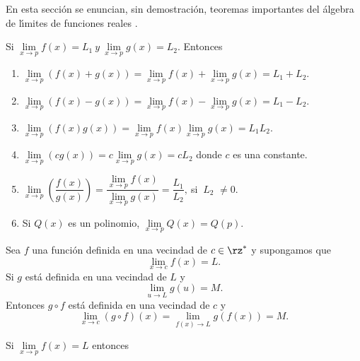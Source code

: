 En esta secci\'{o}n se enuncian, sin demostraci\'{o}n, teoremas importantes
del \'{a}lgebra de l\'{\i}mites de funciones reales .

\begin{theorem}
\label{a1}Si $\lim\limits_{x\rightarrow p}f(x)=L_{1}\ y\ \lim
\limits_{x\rightarrow p}g(x)=L_{2}$. Entonces

\begin{enumerate}
\item $\lim\limits_{x\rightarrow p}\left(  f(x)+g(x)\right)  =\lim
\limits_{x\rightarrow p}f(x)+\lim\limits_{x\rightarrow p}g(x)=L_{1}+L_{2}.$

\item $\lim\limits_{x\rightarrow p}\left(  f(x)-g(x)\right)  =\lim
\limits_{x\rightarrow p}f(x)-\lim\limits_{x\rightarrow p}g(x)=L_{1}-L_{2}.$

\item $\lim\limits_{x\rightarrow p}\left(  f(x)g(x)\right)  =\lim
\limits_{x\rightarrow p}f(x)\lim\limits_{x\rightarrow p}g(x)=L_{1}L_{2}.$

\item $\lim\limits_{x\rightarrow p}\left(  cg(x)\right)  =c\lim
\limits_{x\rightarrow p}g(x)=cL_{2}$ donde $c$ es una constante.

\item $\lim\limits_{x\rightarrow p}\left(  \dfrac{f(x)}{g(x)}\right)
=\dfrac{\lim\limits_{x\rightarrow p}f(x)}{\lim\limits_{x\rightarrow p}%
g(x)}=\dfrac{L_{1}}{L_{2}},\ $si $\ L_{2}$ $\neq0.$

\item Si $Q\left(  x\right)  $ es un polinomio, $\lim\limits_{x\rightarrow
p}Q(x)=Q(p).$
\end{enumerate}
\end{theorem}

\begin{theorem}
\label{limitefuncioncompuesta}
%
Sea $f$ una funci\'{o}n definida en una vecindad de $c\in\rz^{\ast}$ y
supongamos que
\[
\lim_{x\rightarrow c}f(x)=L.
\]
Si $g$ est\'{a} definida en una vecindad de $L$ y
\[
\lim_{u\rightarrow L}g(u)=M.
\]
Entonces $g\circ f$ est\'{a} definida en una vecindad de $c$ y
\[
\lim_{x\rightarrow c}(g\circ f)(x)=\lim_{f(x)\rightarrow L}g(f(x))=M.
\]

\end{theorem}

\begin{corollary}
\label{a2}Si $\lim\limits_{x\rightarrow p}f(x)=L$ entonces
\end{corollary}


